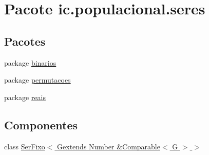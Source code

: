 \hypertarget{namespaceic_1_1populacional_1_1seres}{\section{Pacote ic.\-populacional.\-seres}
\label{namespaceic_1_1populacional_1_1seres}
}
\subsection*{Pacotes}
\begin{DoxyCompactItemize}
\item 
package \hyperlink{namespaceic_1_1populacional_1_1seres_1_1binarios}{binarios}
\item 
package \hyperlink{namespaceic_1_1populacional_1_1seres_1_1permutacoes}{permutacoes}
\item 
package \hyperlink{namespaceic_1_1populacional_1_1seres_1_1reais}{reais}
\end{DoxyCompactItemize}
\subsection*{Componentes}
\begin{DoxyCompactItemize}
\item 
class \hyperlink{classic_1_1populacional_1_1seres_1_1_ser_fixo_3_01_gextends_01_number_01_6_comparable_3_01_g_01_4_01_4}{Ser\-Fixo$<$ Gextends Number \&\-Comparable$<$ G $>$ $>$}
\end{DoxyCompactItemize}
